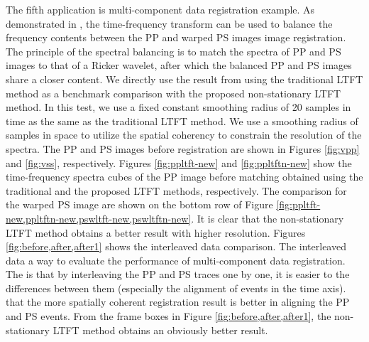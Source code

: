 The fifth application is  multi-component data registration example. As demonstrated in \cite{fomel20052}, the time-frequency transform can be used to balance the frequency contents between the PP and warped PS images  image registration.  The principle of the spectral balancing is to match the spectra of PP and PS images to that of a Ricker wavelet, after which the balanced PP and PS images share a closer  content. We directly use the result from \cite{liuyang2012} using the traditional LTFT method as a benchmark comparison with the proposed non-stationary LTFT method. In this test, we use a fixed constant smoothing radius of 20 samples in time as the same as the traditional LTFT method. We use a smoothing radius of  samples in space to utilize the spatial coherency to constrain the resolution of the spectra. The PP and PS images before registration are shown in Figures \ref{fig:vpp} and \ref{fig:vss}, respectively. Figures \ref{fig:ppltft-new} and \ref{fig:ppltftn-new} show the time-frequency spectra cubes of the PP image before matching obtained using the traditional and the proposed LTFT methods, respectively. The comparison for the warped PS image are shown on the bottom row of Figure \ref{fig:ppltft-new,ppltftn-new,pswltft-new,pswltftn-new}. It is clear that the non-stationary LTFT method obtains a better result with higher resolution. Figures \ref{fig:before,after,after1} shows the interleaved data comparison. The interleaved data  a way to evaluate the performance of multi-component data registration. The  is that by interleaving the PP and PS traces one by one, it is easier to  the differences between them (especially the alignment of events in the time axis).  that the more spatially coherent registration result is better in aligning the PP and PS events. From the frame boxes in Figure \ref{fig:before,after,after1}, the non-stationary LTFT method obtains an obviously better result. 

